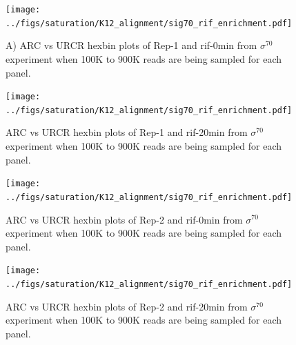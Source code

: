 \documentclass{bmcart}\usepackage[]{graphicx}\usepackage[]{color}
\newcommand{\sig}{\sigma^{70}}
\begin{document}

\newpage

\begin{figure}[h!]
  \centering
  \texttt{[image: ../figs/saturation/K12\_alignment/sig70\_rif\_enrichment.pdf]}
  \caption{A) ARC vs URCR hexbin plots of Rep-1 and rif-0min from $\sig$ experiment when 100K to 900K reads are being
    sampled for each panel. }
  \label{fig:exoQC_sat1}
\end{figure}

\newpage

\begin{figure}[h!]
  \centering
  \texttt{[image: ../figs/saturation/K12\_alignment/sig70\_rif\_enrichment.pdf]}

  \caption{ARC vs URCR hexbin plots of Rep-1 and rif-20min from $\sig$ experiment when 100K to 900K reads are being
    sampled for each panel.}
  \label{fig:exoQC_sat2}
\end{figure}

\newpage

\begin{figure}[h!]
  \centering
  \texttt{[image: ../figs/saturation/K12\_alignment/sig70\_rif\_enrichment.pdf]}
  \caption{ARC vs URCR hexbin plots of Rep-2 and rif-0min from $\sig$ experiment when 100K to 900K reads are being
    sampled for each panel.}
  \label{fig:exoQC_sat3}
\end{figure}

\newpage

\begin{figure}[h!]
  \centering
  \texttt{[image: ../figs/saturation/K12\_alignment/sig70\_rif\_enrichment.pdf]}
  \caption{ARC vs URCR hexbin plots of Rep-2 and rif-20min from $\sig$ experiment when 100K to 900K reads are being
    sampled for each panel.}
  \label{fig:exoQC_sat4}
\end{figure}
\end{document}
